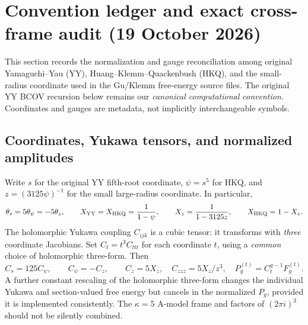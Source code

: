 \section{Convention ledger and exact cross-frame audit (19 October 2026)}
\label{sec:ledger2026}
This section records the normalization and gauge reconciliation among original
Yamaguchi--Yau (YY), Huang--Klemm--Quackenbush (HKQ), and the small-radius
coordinate used in the Gu/Klemm free-energy source files. The original YY
BCOV recursion below remains our \emph{canonical computational convention}.
Coordinates and gauges are metadata, not implicitly interchangeable symbols.

\subsection{Coordinates, Yukawa tensors, and normalized amplitudes}
Write $s$ for the original YY fifth-root coordinate, $\psi=s^5$ for HKQ, and
$z=(3125\psi)^{-1}$ for the small large-radius coordinate. In particular,
\begin{equation}\label{eq:2026coordinates}
 \theta_s=5\theta_\psi=-5\theta_z,\qquad
 X_{\rm YY}=X_{\rm HKQ}=\frac{1}{1-\psi},\qquad
 X_z=\frac{1}{1-3125z},\qquad X_{\rm HKQ}=1-X_z.
\end{equation}
The holomorphic Yukawa coupling $C_{ijk}$ is a cubic tensor: it transforms with
\emph{three} coordinate Jacobians. Set $C_t=t^3C_{ttt}$ for each coordinate $t$,
using a \emph{common} choice of holomorphic three-form. Then
\begin{equation}
 C_s=125 C_\psi,\qquad C_\psi=-C_z,
 \qquad C_z=5X_z,\quad C_{zzz}=5X_z/z^3,
 \quad P_g^{(t)}=C_t^{g-1}F_g^{(t)}.
\end{equation}
A further constant rescaling of the holomorphic three-form changes the
individual Yukawa and section-valued free energy but cancels in the normalized
$P_g$, provided it is implemented consistently. The $\kappa=5$ A-model frame
and factors of $(2\pi i)^3$ should not be silently combined.

